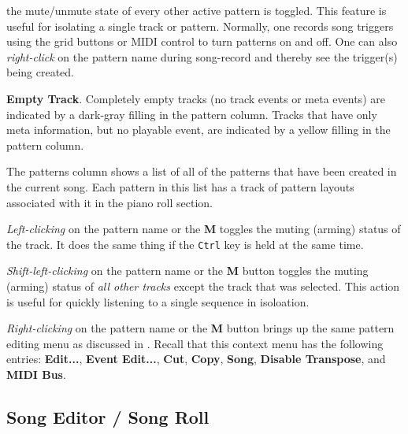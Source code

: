 \begin{enumber}
         the mute/unmute state of every other active pattern is toggled.
         This feature is useful for isolating a single track or pattern.
         Normally, one records song triggers using the grid buttons or MIDI
         control to turn patterns on and off.
         One can also \textsl{right-click} on the pattern
         name during song-record and
         thereby see the trigger(s) being created.
      \item \textbf{Empty Track}.
         Completely empty tracks (no track events or meta events)
         are indicated by a dark-gray filling in the pattern column.
         Tracks that have only meta information, but no playable event, are
         indicated by a yellow filling in the pattern column.
   \end{enumber}

   The patterns column shows a list of all of the patterns that have been
   created in the current song.  Each pattern in this list has a track of
   pattern layouts associated with it in the piano roll section.

   \textsl{Left-clicking} on the pattern name or the \textbf{M} toggles the muting
   (arming) status of the track.
   It does the same thing if the \texttt{Ctrl} key is held at the same time.

   \textsl{Shift-left-clicking} on the pattern name
   or the \textbf{M} button toggles the muting
   (arming) status of \textsl{all other tracks} except the track that was
   selected.  This action is useful for quickly listening to a single sequence
   in isoloation.

   \textsl{Right-clicking} on the pattern name or
   the \textbf{M} button brings up the same
   pattern editing menu as discussed in
   .
   Recall that this context menu has the following entries:
   \textbf{Edit...}, \textbf{Event Edit...}, \textbf{Cut}, \textbf{Copy},
   \textbf{Song}, \textbf{Disable Transpose}, and \textbf{MIDI Bus}.

\subsection{Song Editor / Song Roll}
\label{subsec:song_editor_song_roll}

